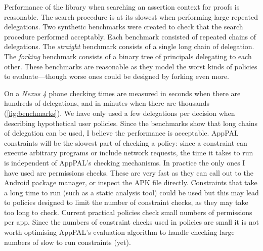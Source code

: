 \documentclass[a4paper]{scrartcl}
\begin{document}
Performance of the library when searching an assertion context for proofs is reasonable.
The search procedure is at its slowest when performing large repeated delegations.
Two synthetic benchmarks were created to check that the search procedure performed acceptably.
Each benchmark consisted of repeated chains of delegations.
The \emph{straight} benchmark consists of a single long chain of delegation.
The \emph{forking} benchmark consists of a binary tree of principals delegating to each other.
These benchmarks are reasonable as they model the worst kinds of policies to evaluate---though worse ones could be designed by forking even more.

On a \emph{Nexus 4} phone checking times are measured in seconds when there are hundreds of delegations, and in minutes when there are thousands (\autoref{fig:benchmarks}).
We have only used a few delegations per decision when describing hypothetical user policies.
Since the benchmarks show that long chains of delegation can be used, I believe the performance is acceptable.
AppPAL constraints will be the slowest part of checking a policy:
  since a constraint can execute arbitrary programs or include network requests, the time it takes to run is independent of AppPAL's checking mechanisms.
In practice the only ones I have used are permissions checks.
These are very fast as they can call out to the Android package manager, or inspect the APK file directly.
Constraints that take a long time to run (such as a static analysis tool) could be used but this may lead to policies designed to limit the number of constraint checks, as they may take too long to check.
Current practical policies check small numbers of permissions per app.
Since the numbers of constraint checks used in policies are small it is not worth optimising AppPAL's evaluation algorithm to handle checking large numbers of slow to run constraints (yet).
\end{document}
